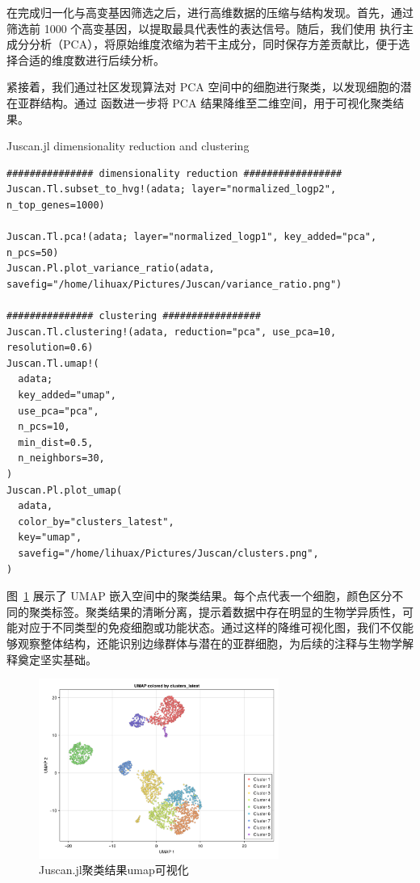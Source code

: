 在完成归一化与高变基因筛选之后，进行高维数据的压缩与结构发现。首先，通过  筛选前 1000 个高变基因，以提取最具代表性的表达信号。随后，我们使用  执行主成分分析（PCA），将原始维度浓缩为若干主成分，同时保存方差贡献比，便于选择合适的维度数进行后续分析。

紧接着，我们通过社区发现算法对 PCA 空间中的细胞进行聚类，以发现细胞的潜在亚群结构。通过  函数进一步将 PCA 结果降维至二维空间，用于可视化聚类结果。

\begin{fancybox}{Juscan.jl dimensionality reduction and clustering}
\begin{lstlisting}
############### dimensionality reduction #################
Juscan.Tl.subset_to_hvg!(adata; layer="normalized_logp2", n_top_genes=1000)

Juscan.Tl.pca!(adata; layer="normalized_logp1", key_added="pca", n_pcs=50)
Juscan.Pl.plot_variance_ratio(adata, savefig="/home/lihuax/Pictures/Juscan/variance_ratio.png")

############### clustering #################
Juscan.Tl.clustering!(adata, reduction="pca", use_pca=10, resolution=0.6)
Juscan.Tl.umap!(
  adata;
  key_added="umap",
  use_pca="pca",
  n_pcs=10,
  min_dist=0.5,
  n_neighbors=30,
)
Juscan.Pl.plot_umap(
  adata,
  color_by="clusters_latest",
  key="umap",
  savefig="/home/lihuax/Pictures/Juscan/clusters.png",
)
\end{lstlisting}
\end{fancybox}

图~\ref{img:clusters umap plot} 展示了 UMAP 嵌入空间中的聚类结果。每个点代表一个细胞，颜色区分不同的聚类标签。聚类结果的清晰分离，提示着数据中存在明显的生物学异质性，可能对应于不同类型的免疫细胞或功能状态。通过这样的降维可视化图，我们不仅能够观察整体结构，还能识别边缘群体与潜在的亚群细胞，为后续的注释与生物学解释奠定坚实基础。

\begin{figure}[htbp]
  \centering
  \includegraphics[width=0.7\textwidth]{img/juscan_clusters.png}
  \caption{Juscan.jl聚类结果umap可视化}
  \label{img:clusters umap plot}
\end{figure}


